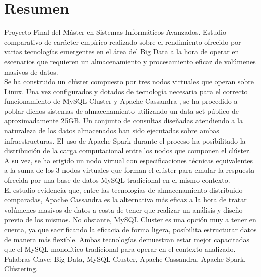 \section*{Resumen}

Proyecto Final del Máster en Sistemas Informáticos Avanzados. Estudio comparativo de carácter empírico realizado sobre el rendimiento ofrecido por varias tecnologías emergentes en el área del Big Data a la hora de operar en escenarios que requieren un almacenamiento y procesamiento eficaz de volúmenes masivos de datos.\\

Se ha construido un clúster compuesto por tres nodos virtuales que operan sobre Linux. Una vez configurados y dotados de tecnología necesaria para el correcto funcionamiento de MySQL Cluster \cite{mysqlcluster} y Apache Cassandra \cite{apachecassandra}, se ha procedido a poblar dichos sistemas de almacenamiento utilizando un data-set público de aproximadamente 25GB. Un conjunto de consultas diseñadas atendiendo a la naturaleza de los datos almacenados han sido ejecutadas sobre ambas infraestructuras. El uso de Apache Spark \cite{apachespark} durante el proceso ha posibilitado la distribución de la carga computacional entre los nodos que componen el clúster. A su vez, se ha erigido un nodo virtual con especificaciones técnicas equivalentes a la suma de los 3 nodos virtuales que forman el clúster para emular la respuesta ofrecida por una base de datos MySQL tradicional en el mismo contexto.\\

El estudio evidencia que, entre las tecnologías de almacenamiento distribuido comparadas, Apache Cassandra es la alternativa más eficaz a la hora de tratar volúmenes masivos de datos a costa de tener que realizar un análisis y diseño previo de los mismos. No obstante, MySQL Cluster es una opción muy a tener en cuenta, ya que sacrificando la eficacia de forma ligera, posibilita estructurar datos de manera más flexible. Ambas tecnologías demuestran estar mejor capacitadas que el MySQL monolítico tradicional para operar en el contexto analizado.\\


Palabras Clave: Big Data, MySQL Cluster, Apache Cassandra, Apache Spark, Clústering.\\
